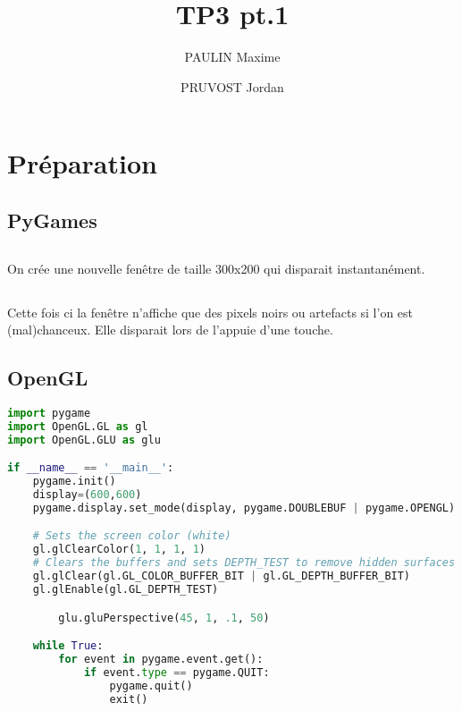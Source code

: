 \documentclass{article}
\title{TP3 pt.1}
\author{PAULIN Maxime \and PRUVOST Jordan}
\begin{document}
\maketitle

\setcounter{section}{1}
\section{Préparation}
\subsection*{PyGames}
\subsection{}
On crée une nouvelle fenêtre de taille 300x200 qui disparait instantanément.

\subsection{}
Cette fois ci la fenêtre n'affiche que des pixels noirs ou artefacts si l'on est (mal)chanceux. Elle disparait lors de l'appuie d'une touche.

\subsection*{OpenGL}
\begin{lstlisting}[language=Python]
import pygame
import OpenGL.GL as gl
import OpenGL.GLU as glu

if __name__ == '__main__':
    pygame.init()
    display=(600,600)
    pygame.display.set_mode(display, pygame.DOUBLEBUF | pygame.OPENGL)

    # Sets the screen color (white)
    gl.glClearColor(1, 1, 1, 1)
    # Clears the buffers and sets DEPTH_TEST to remove hidden surfaces
    gl.glClear(gl.GL_COLOR_BUFFER_BIT | gl.GL_DEPTH_BUFFER_BIT)
    gl.glEnable(gl.GL_DEPTH_TEST)

		glu.gluPerspective(45, 1, .1, 50)

    while True:
        for event in pygame.event.get():
        	if event.type == pygame.QUIT:
        		pygame.quit()
                exit()
\end{lstlisting}
\newpage
\end{document}
